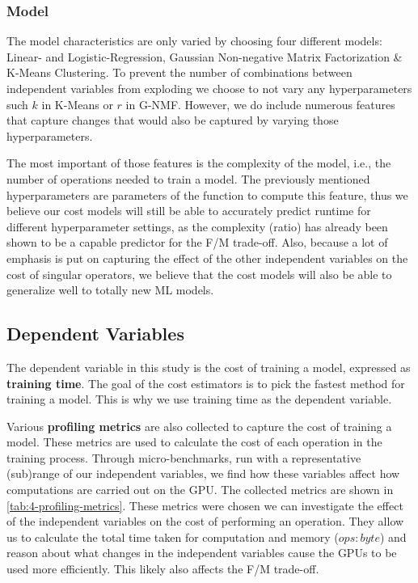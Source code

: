 \subsubsection{Model}
The model characteristics are only varied by choosing four different models: Linear- and Logistic-Regression, Gaussian Non-negative Matrix Factorization \& K-Means Clustering. To prevent the number of combinations between independent variables from exploding we choose to not vary any hyperparameters such $k$ in K-Means or $r$ in G-NMF. However, we do include numerous features that capture changes that would also be captured by varying those hyperparameters.

The most important of those features is the complexity of the model, i.e., the number of operations needed to train a model. The previously mentioned hyperparameters are parameters of the function to compute this feature, thus we believe our cost models will still be able to accurately predict runtime for different hyperparameter settings, as the complexity (ratio) has already been shown to be a capable predictor for the F/M trade-off. Also, because a lot of emphasis is put on capturing the effect of the other independent variables on the cost of singular operators, we believe that the cost models will also be able to generalize well to totally new ML models.

\subsection{Dependent Variables}

The dependent variable in this study is the cost of training a model, expressed as \textbf{training time}. The goal of the cost estimators is to pick the fastest method for training a model. This is why we use training time as the dependent variable.

Various \textbf{profiling metrics} are also collected to capture the cost of training a model. These metrics are used to calculate the cost of each operation in the training process. Through micro-benchmarks, run with a representative (sub)range of our independent variables, we find how these variables affect how computations are carried out on the GPU. The collected metrics are shown in \autoref{tab:4-profiling-metrics}. These metrics were chosen we can investigate the effect of the independent variables on the cost of performing an operation. They allow us to calculate the total time taken for computation and memory ($ops:byte$) and reason about what changes in the independent variables cause the GPUs to be used more efficiently. This likely also affects the F/M trade-off.

